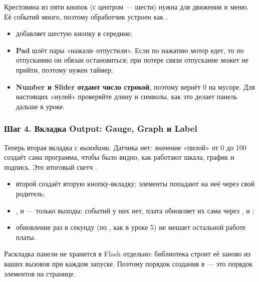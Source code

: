 Крестовина из пяти кнопок (с центром --- шести) нужна для движения и меню. Её событий много, поэтому
обработчик устроен как .


\begin{itemize}[leftmargin=*]
  \item {} добавляет шестую кнопку в середине;
  \item \textbf{Pad} шлёт пары «нажали--отпустили». Если по нажатию мотор едет, то по отпусканию он
        обязан остановиться; при потере связи отпускание может не прийти, поэтому нужен таймер;
  \item \textbf{Number и Slider отдают число строкой}, поэтому  вернёт 0 на мусоре.
        Для настоящих «нулей» проверяйте длину и символы, как это делает панель дальше в уроке.
\end{itemize}

\subsubsection{Шаг 4. Вкладка Output: Gauge, Graph и Label}

Теперь вторая вкладка с \emph{выходами}. Датчика нет: значение «пилой» от 0 до 100 создаёт сама программа,
чтобы было видно, как работают шкала, график и подпись. Это итоговый скетч .


\begin{itemize}[leftmargin=*]
  \item второй  создаёт вторую кнопку-вкладку; элементы попадают на неё через свой родитель;
  \item {},  и  --- только выходы: событий у них нет, плата обновляет их
        сама через ,  и ;
  \item обновление раз в секунду (по , как в уроке 5) не мешает остальной работе платы.
\end{itemize}

\begin{fact}
Раскладка панели не хранится в Flash отдельно: библиотека строит её заново из ваших вызовов
 при каждом запуске. Поэтому порядок создания в  --- это порядок
элементов на странице.
\end{fact}

